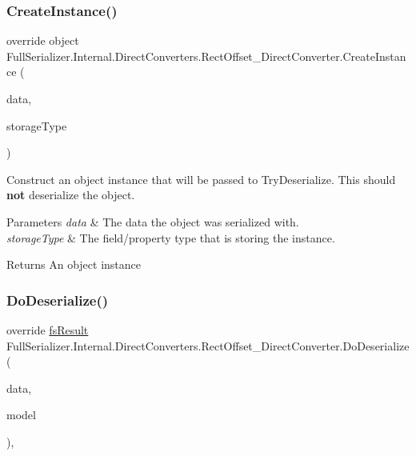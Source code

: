 \subsubsection{\texorpdfstring{Create\+Instance()}{CreateInstance()}}
{\footnotesize\ttfamily override object Full\+Serializer.\+Internal.\+Direct\+Converters.\+Rect\+Offset\+\_\+\+Direct\+Converter.\+Create\+Instance (\begin{DoxyParamCaption}\item[{\hyperlink{class_full_serializer_1_1fs_data}{fs\+Data}}]{data,  }\item[{Type}]{storage\+Type }\end{DoxyParamCaption})\hspace{0.3cm}{\ttfamily [inline]}}



Construct an object instance that will be passed to Try\+Deserialize. This should {\bfseries not} deserialize the object. 


\begin{DoxyParams}{Parameters}
{\em data} & The data the object was serialized with.\\
\hline
{\em storage\+Type} & The field/property type that is storing the instance.\\
\hline
\end{DoxyParams}
\begin{DoxyReturn}{Returns}
An object instance
\end{DoxyReturn}
\mbox{\label{class_full_serializer_1_1_internal_1_1_direct_converters_1_1_rect_offset___direct_converter_adea41ce680e0167a48f5a92866bde8a4}} 
\subsubsection{\texorpdfstring{Do\+Deserialize()}{DoDeserialize()}}
{\footnotesize\ttfamily override \hyperlink{struct_full_serializer_1_1fs_result}{fs\+Result} Full\+Serializer.\+Internal.\+Direct\+Converters.\+Rect\+Offset\+\_\+\+Direct\+Converter.\+Do\+Deserialize (\begin{DoxyParamCaption}\item[{Dictionary$<$ string, \hyperlink{class_full_serializer_1_1fs_data}{fs\+Data} $>$}]{data,  }\item[{ref Rect\+Offset}]{model }\end{DoxyParamCaption})\hspace{0.3cm}{\ttfamily [inline]}, {\ttfamily [protected]}}



